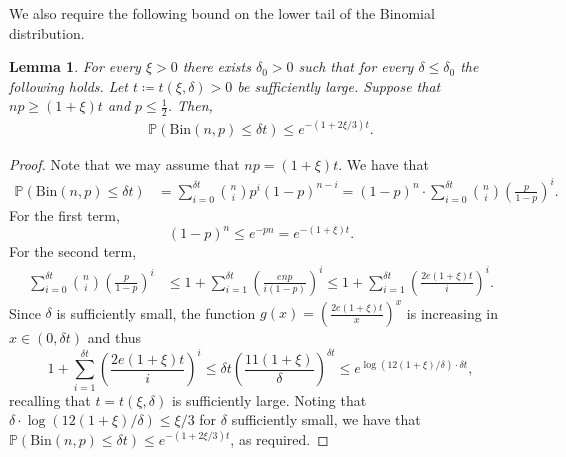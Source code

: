 \documentclass[notitlepage]{scrartcl}
\newtheorem{lemma}[thm]{Lemma}
\begin{document}
We also require the following bound on the lower tail of the Binomial distribution.
\begin{lemma}\label{l: binom lower tail}
For every $\xi>0$ there exists $\delta_0>0$ such that for every $\delta\le \delta_0$ the following holds. Let $t\coloneqq t(\xi,\delta)>0$ be sufficiently large. Suppose that $np\ge (1+\xi)t$ and $p\le \frac{1}{2}$. Then,
\begin{align*}
    \mathbb{P}\left(\text{Bin}\left(n,p\right)\le \delta t\right)\le e^{-(1+2\xi/3)t}.
\end{align*}
\end{lemma}
\begin{proof}
Note that we may assume that $np=(1+\xi)t$. We have that
\begin{align*}
    \mathbb{P}\left(\text{Bin}\left(n, p\right) \le \delta t\right) &= \sum_{i = 0}^{\delta t} \binom{n}{i} p^i \left(1 - p\right)^{n-i} 
    = \left(1 - p\right)^{n} \cdot \sum_{i = 0}^{\delta t} \binom{n}{i} \left(\frac{p}{1 - p}\right)^i.
\end{align*}
For the first term,
\[
    \left(1 - p\right)^{n} \le e^{-pn}= e^{-(1+\xi)t}.
\]
For the second term,
\begin{align*}
\sum_{i = 0}^{\delta t} \binom{n}{i} \left(\frac{p}{1 - p}\right)^i&\le 1+\sum_{i=1}^{\delta t}\left(\frac{enp}{i(1-p)}\right)^i\le 1+\sum_{i=1}^{\delta t}\left(\frac{2e(1+\xi)t}{i}\right)^i.
\end{align*}
Since $\delta$ is sufficiently small, the function $g(x) = \left(\frac{2e(1+\xi)t}{x}\right)^x$ is increasing in $x \in (0, \delta t)$ and thus
\[
    1 + \sum_{i=1}^{\delta t}\left(\frac{2e(1+\xi)t}{i}\right)^i \le \delta t \left(\frac{11(1+\xi)}{\delta }\right)^{\delta t}\le e^{\log\left(12(1+\xi)/\delta\right)\cdot\delta t},
\]
recalling that $t=t(\xi,\delta)$ is sufficiently large. Noting that $\delta \cdot \log\left(12(1+\xi)/\delta\right)\le \xi/3$ for $\delta$ sufficiently small, we have that $\mathbb{P}\left(\text{Bin}\left(n, p\right) \le \delta t\right)\le e^{-(1+2\xi/3)t}$, as required.
\end{proof}
\end{document}
